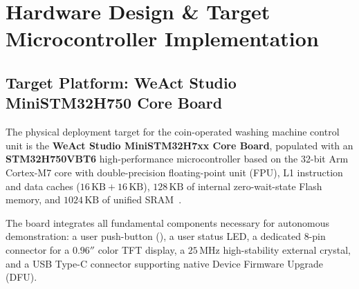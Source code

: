 \section{Hardware Design \& Target Microcontroller Implementation}
\label{sec:hardware}

\subsection{Target Platform: WeAct Studio MiniSTM32H750 Core Board}

The physical deployment target for the coin-operated washing machine control unit is the
\textbf{WeAct Studio MiniSTM32H7xx Core Board}, populated with an \textbf{STM32H750VBT6}
high-performance microcontroller based on the 32-bit Arm Cortex-M7 core with double-precision
floating-point unit (FPU), L1 instruction and data caches ($16\,\text{KB} + 16\,\text{KB}$),
$128\,\text{KB}$ of internal zero-wait-state Flash memory, and $1024\,\text{KB}$ of unified SRAM~\cite{stm32h750ds,stm32h7rm,weactrepo}.

The board integrates all fundamental components necessary for autonomous demonstration:
a user push-button (), a user status LED, a dedicated 8-pin connector for a $0.96''$
color TFT display, a $25\,\text{MHz}$ high-stability external crystal, and a USB Type-C connector
supporting native Device Firmware Upgrade (DFU).

